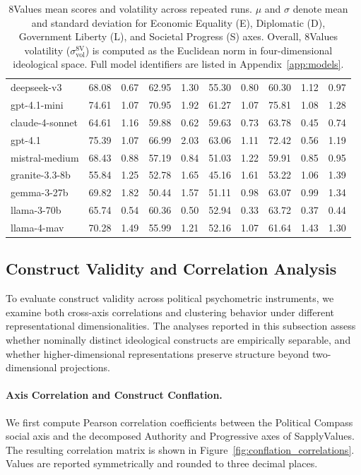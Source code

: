 \documentclass[11pt]{article}
\begin{document}
\begin{table}[t]
\begin{tabular}{l r r r r r r r r r}
deepseek-v3      & 68.08 & 0.67 & 62.95 & 1.30 & 55.30 & 0.80 & 60.30 & 1.12 & 0.97 \\
gpt-4.1-mini     & 74.61 & 1.07 & 70.95 & 1.92 & 61.27 & 1.07 & 75.81 & 1.08 & 1.28 \\
claude-4-sonnet  & 64.61 & 1.16 & 59.88 & 0.62 & 59.63 & 0.73 & 63.78 & 0.45 & 0.74 \\
gpt-4.1          & 75.39 & 1.07 & 66.99 & 2.03 & 63.06 & 1.11 & 72.42 & 0.56 & 1.19 \\
mistral-medium   & 68.43 & 0.88 & 57.19 & 0.84 & 51.03 & 1.22 & 59.91 & 0.85 & 0.95 \\
granite-3.3-8b   & 55.84 & 1.25 & 52.78 & 1.65 & 45.16 & 1.61 & 53.22 & 1.06 & 1.39 \\
gemma-3-27b      & 69.82 & 1.82 & 50.44 & 1.57 & 51.11 & 0.98 & 63.07 & 0.99 & 1.34 \\
llama-3-70b      & 65.74 & 0.54 & 60.36 & 0.50 & 52.94 & 0.33 & 63.72 & 0.37 & 0.44 \\
llama-4-mav      & 70.28 & 1.49 & 55.99 & 1.21 & 52.16 & 1.07 & 61.64 & 1.43 & 1.30 \\
\bottomrule
\end{tabular}
\caption{8Values mean scores and volatility across repeated runs. $\mu$ and $\sigma$ denote mean and standard deviation for Economic Equality (E), Diplomatic (D), Government Liberty (L), and Societal Progress (S) axes. Overall, 8Values volatility ($\sigma^{\text{8V}}_{\text{vol}}$) is computed as the Euclidean norm in four-dimensional ideological space. Full model identifiers are listed in Appendix~\ref{app:models}.}
\label{tab:8values_volatility}
\end{table}





\subsection{Construct Validity and Correlation Analysis}
\label{app:construct-validity}

To evaluate construct validity across political psychometric instruments, we examine both cross-axis correlations and clustering behavior under different representational dimensionalities. The analyses reported in this subsection assess whether nominally distinct ideological constructs are empirically separable, and whether higher-dimensional representations preserve structure beyond two-dimensional projections.

\paragraph{Axis Correlation and Construct Conflation.}
We first compute Pearson correlation coefficients between the Political Compass social axis and the decomposed Authority and Progressive axes of SapplyValues. The resulting correlation matrix is shown in Figure~\ref{fig:conflation_correlations}. Values are reported symmetrically and rounded to three decimal places.
\end{document}
